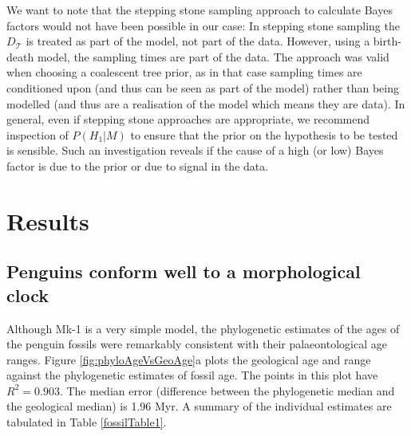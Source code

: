 \documentclass[11pt]{article}
\newcommand{\Mstrict}{{Mk-1}}
\begin{document}
We want to note that the stepping stone sampling approach \cite{Xie2011}
 to calculate Bayes factors would not have been possible in our case:  In stepping stone sampling the $D_\mathcal{T}$ is treated as part of the model, not part of the data. However, using a birth-death model, the sampling times are part of the data. The approach was valid when choosing a  coalescent tree prior, as in that case sampling times are conditioned upon (and thus can be seen as part of the model) rather than being modelled (and thus are a realisation of the model which means they are data).
In general, even if stepping stone approaches are appropriate, we recommend inspection of $P(H_1|M)$ to ensure that the prior on the hypothesis to be tested is sensible. Such an investigation reveals if the cause of a high (or low) Bayes factor is due to the prior or due to signal in the data.

\section*{Results}

\subsection*{Penguins conform well to a morphological clock}
Although \Mstrict{} is a very simple model, the phylogenetic estimates of the ages of the penguin fossils were remarkably consistent with their palaeontological age ranges. 
Figure \ref{fig:phyloAgeVsGeoAge}a plots the geological age and range against the phylogenetic estimates of fossil age. The points in this plot have $R^2 = 0.903$. 
The median error (difference between the phylogenetic median and the geological median) is 1.96 Myr. A summary of the individual estimates are tabulated in Table \ref{fossilTable1}.
\end{document}
